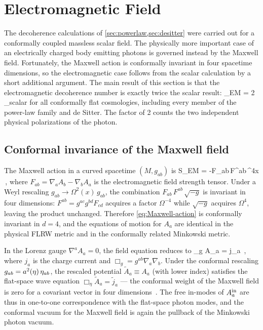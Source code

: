 
\section{Electromagnetic Field}
\label{sec:em}

The decoherence calculations of \cref{sec:powerlaw,sec:desitter} were carried
out for a conformally coupled massless scalar field.  The physically more
important case of an electrically charged body emitting photons is governed
instead by the Maxwell field.  Fortunately, the Maxwell action is conformally
invariant in four spacetime dimensions, so the electromagnetic case follows
from the scalar calculation by a short additional argument.  The main result
of this section is that the electromagnetic decoherence number is exactly
twice the scalar result:
%
\be
  \Nnum_{\rm EM} = 2\,\Nnum_{\rm scalar}
  \label{eq:N-EM-factor2}
\ee
%
for all conformally flat cosmologies, including every member of the power-law
family and de Sitter.  The factor of 2 counts the two independent physical
polarizations of the photon.

\subsection{Conformal invariance of the Maxwell field}
\label{sec:em-conformal}

The Maxwell action in a curved spacetime $(M, g_{ab})$ is
%
\be
  S_{\rm EM}
  =
  -\int F_{ab}\,F^{ab}\,\;^4x \,,
  \label{eq:Maxwell-action}
\ee
%
where $F_{ab} = \nabla_a A_b - \nabla_b A_a$ is the electromagnetic field
strength tensor.  Under a Weyl rescaling $g_{ab} \to \Omega^2(x)\,g_{ab}$,
the combination $F_{ab}\,F^{ab}\,\sqrt{-g}$ is invariant in four dimensions:
$F^{ab} = g^{ac}g^{bd}F_{cd}$ acquires a factor $\Omega^{-4}$ while
$\sqrt{-g}$ acquires $\Omega^4$, leaving the product unchanged.  Therefore
\cref{eq:Maxwell-action} is conformally invariant in $d = 4$, and the
equations of motion for $A_a$ are identical in the physical FLRW metric and
in the conformally related Minkowski metric.

In the Lorenz gauge $\nabla^a A_a = 0$, the field equation reduces to
%
\be
  \Box_g A_a = j_a \,,
  \label{eq:Maxwell-eom}
\ee
%
where $j_a$ is the charge current and $\Box_g = g^{ab}\nabla_a\nabla_b$.
Under the conformal rescaling $g_{ab} = a^2(\eta)\,\eta_{ab}$, the
rescaled potential $\tilde{A}_a \equiv A_a$ (with lower index) satisfies
the flat-space wave equation $\Box_\eta \tilde{A}_a = \tilde{j}_a$ — the
conformal weight of the Maxwell field is zero for a covariant vector in four
dimensions~\cite{Wald84}.  The free in-modes of $A_a^{\rm in}$ are thus
in one-to-one correspondence with the flat-space photon modes, and the
conformal vacuum for the Maxwell field is again the pullback of the Minkowski
photon vacuum.

